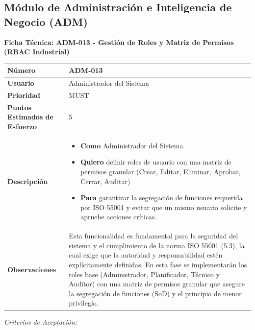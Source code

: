 \subsection{Módulo de Administración e Inteligencia de Negocio (ADM)}
\noindent\textbf{Ficha Técnica: ADM-013 - Gestión de Roles y Matriz de Permisos (RBAC Industrial)}
\footnotesize\setlength{\tabcolsep}{4pt}\renewcommand{\arraystretch}{1.2}
\begin{longtable}{|p{0.21\textwidth}|p{0.74\textwidth}|}\hline
\textbf{Número} & ADM-013 \\ \hline
\textbf{Usuario} & Administrador del Sistema \\ \hline
\textbf{Prioridad} & MUST \\ \hline
\textbf{Puntos Estimados de Esfuerzo} & 5 \\ \hline
\textbf{Descripción} & \parbox[t]{\linewidth}{\vspace{2pt}\begin{itemize}[leftmargin=1.5em, nosep, topsep=0pt]
\item \textbf{Como} Administrador del Sistema
\item \textbf{Quiero} definir roles de usuario con una matriz de permisos granular (Crear, Editar, Eliminar, Aprobar, Cerrar, Auditar)
\item \textbf{Para} garantizar la segregación de funciones requerida por ISO 55001 y evitar que un mismo usuario solicite y apruebe acciones críticas.
\end{itemize}\vspace{2pt}} \\ \hline
\textbf{Observaciones} & Esta funcionalidad es fundamental para la seguridad del sistema y el cumplimiento de la norma ISO 55001 (5.3), la cual exige que la autoridad y responsabilidad estén explícitamente definidas. En esta fase se implementarán los roles base (Administrador, Planificador, Técnico y Auditor) con una matriz de permisos granular que asegure la segregación de funciones (SoD) y el principio de menor privilegio. \\ \hline
\end{longtable}\normalsize
\noindent\textit{Criterios de Aceptación:}
